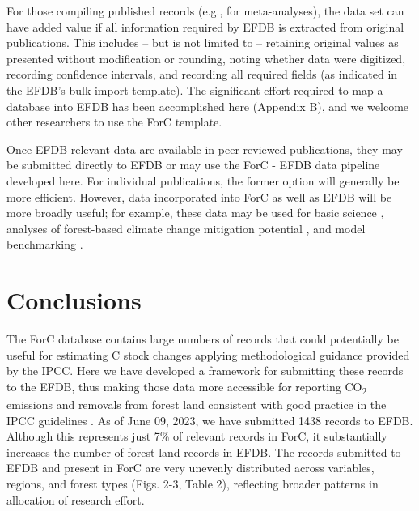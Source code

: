 \documentclass[, manuscript]{copernicus}
\begin{document}
For those compiling published records (e.g., for meta-analyses), the
data set can have added value if all information required by EFDB is
extracted from original publications. This includes -- but is not
limited to -- retaining original values as presented without
modification or rounding, noting whether data were digitized, recording
confidence intervals, and recording all required fields (as indicated in
the EFDB's bulk import template). The significant effort required to map
a database into EFDB has been accomplished here (Appendix B), and we
welcome other researchers to use the ForC template.

Once EFDB-relevant data are available in peer-reviewed publications,
they may be submitted directly to EFDB or may use the ForC - EFDB data
pipeline developed here. For individual publications, the former option
will generally be more efficient. However, data incorporated into ForC
as well as EFDB will be more broadly useful; for example, these data may
be used for basic science
\citep[e.g.,][]{banburymorgan_global_2021, anderson-teixeira_carbon_2021},
analyses of forest-based climate change mitigation potential
\citep[e.g.,][]{cook-patton_mapping_2020, goldstein_protecting_2020},
and model benchmarking \citep{fer_ecosystem_2021}.

\section{Conclusions}

The ForC database contains large numbers of records that could
potentially be useful for estimating C stock changes applying
methodological guidance provided by the IPCC. Here we have developed a
framework for submitting these records to the EFDB, thus making those
data more accessible for reporting CO\textsubscript{2} emissions and
removals from forest land consistent with good practice in the IPCC
guidelines \citep{ipcc_2006_2006, ipcc_2019_2019}. As of June 09, 2023,
we have submitted 1438 records to EFDB. Although this represents just
7\% of relevant records in ForC, it substantially increases the number
of forest land records in EFDB. The records submitted to EFDB and
present in ForC are very unevenly distributed across variables, regions,
and forest types (Figs. 2-3, Table 2), reflecting broader patterns in
allocation of research effort.
\end{document}

